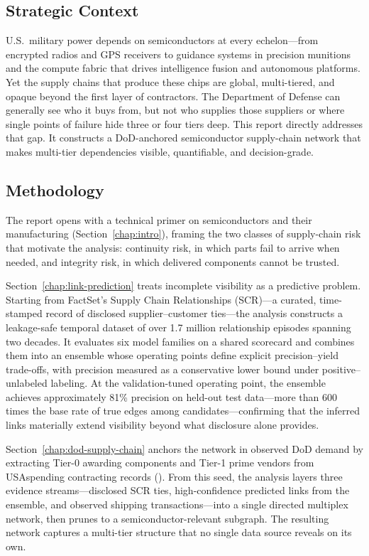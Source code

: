 \subsection*{Strategic Context}

U.S.\ military power depends on semiconductors at every echelon---from encrypted radios and GPS receivers to guidance systems in precision munitions and the compute fabric that drives intelligence fusion and autonomous platforms. Yet the supply chains that produce these chips are global, multi-tiered, and opaque beyond the first layer of contractors. The Department of Defense can generally see who it buys from, but not who supplies those suppliers or where single points of failure hide three or four tiers deep. This report directly addresses that gap. It constructs a DoD-anchored semiconductor supply-chain network that makes multi-tier dependencies visible, quantifiable, and decision-grade.

\subsection*{Methodology}

The report opens with a technical primer on semiconductors and their manufacturing (Section~\ref{chap:intro}), framing the two classes of supply-chain risk that motivate the analysis: continuity risk, in which parts fail to arrive when needed, and integrity risk, in which delivered components cannot be trusted.

Section~\ref{chap:link-prediction} treats incomplete visibility as a predictive problem. Starting from FactSet's Supply Chain Relationships (SCR)---a curated, time-stamped record of disclosed supplier--customer ties---the analysis constructs a leakage-safe temporal dataset of over 1.7 million relationship episodes spanning two decades. It evaluates six model families on a shared scorecard and combines them into an ensemble whose operating points define explicit precision--yield trade-offs, with precision measured as a conservative lower bound under positive--unlabeled labeling. At the validation-tuned operating point, the ensemble achieves approximately 81\% precision on held-out test data---more than 600 times the base rate of true edges among candidates---confirming that the inferred links materially extend visibility beyond what disclosure alone provides.

Section~\ref{chap:dod-supply-chain} anchors the network in observed DoD demand by extracting Tier-0 awarding components and Tier-1 prime vendors from USAspending contracting records (\ContractingWindow). From this seed, the analysis layers three evidence streams---disclosed SCR ties, high-confidence predicted links from the ensemble, and observed shipping transactions---into a single directed multiplex network, then prunes to a semiconductor-relevant subgraph. The resulting network captures a multi-tier structure that no single data source reveals on its own.

